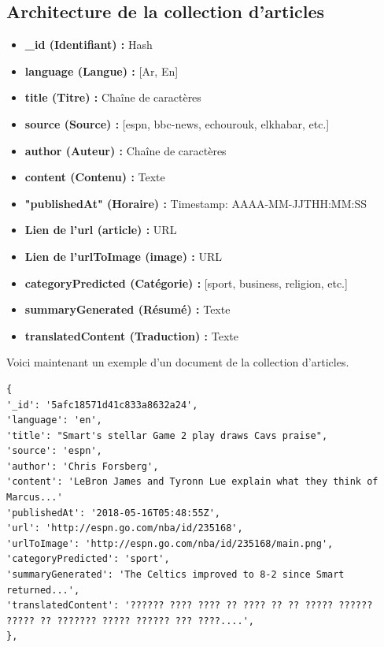 \subsection{Architecture de la collection d'articles}
\begin{itemize}
    \item \textbf{\_id (Identifiant) :} Hash  
    \item \textbf{language (Langue) :} [\textquotesingle Ar\textquotesingle, \textquotesingle En\textquotesingle]
    \item \textbf{title (Titre) :} Chaîne de caractères
    \item \textbf{source (Source) :} [\textquotesingle espn\textquotesingle, \textquotesingle bbc-news\textquotesingle, \textquotesingle echourouk\textquotesingle, \textquotesingle elkhabar\textquotesingle, etc.]
    \item \textbf{author (Auteur) :} Chaîne de caractères
    \item \textbf{content (Contenu) :} Texte
    \item \textbf{"publishedAt" (Horaire) :} Timestamp: AAAA-MM-JJTHH:MM:SS
    \item \textbf{Lien de l'url (article) :} URL
    \item \textbf{Lien de l'urlToImage (image) :} URL 
    \item \textbf{categoryPredicted (Catégorie) :} [\textquotesingle sport\textquotesingle, \textquotesingle business\textquotesingle, \textquotesingle religion\textquotesingle, etc.]
    \item \textbf{summaryGenerated (Résumé) :} Texte
    \item \textbf{translatedContent (Traduction) :} Texte
\end{itemize}
Voici maintenant un exemple d'un document de la collection d'articles.

\begin{lstlisting}[style=code]
{
'_id': '5afc18571d41c833a8632a24', 
'language': 'en',
'title': "Smart's stellar Game 2 play draws Cavs praise", 
'source': 'espn', 
'author': 'Chris Forsberg', 
'content': 'LeBron James and Tyronn Lue explain what they think of Marcus...'
'publishedAt': '2018-05-16T05:48:55Z', 
'url': 'http://espn.go.com/nba/id/235168',
'urlToImage': 'http://espn.go.com/nba/id/235168/main.png',  
'categoryPredicted': 'sport', 
'summaryGenerated': 'The Celtics improved to 8-2 since Smart returned...', 
'translatedContent': '?????? ???? ???? ?? ???? ?? ?? ????? ?????? ????? ?? ??????? ????? ?????? ??? ????....', 
},
\end{lstlisting}

